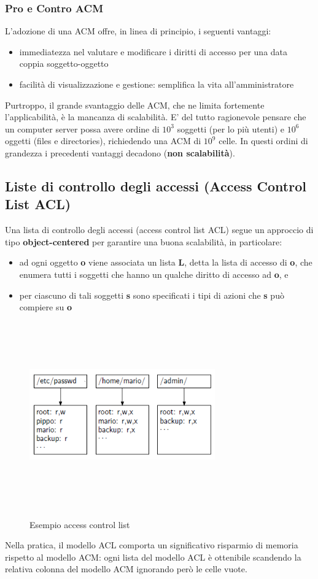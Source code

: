 \subsubsection{Pro e Contro ACM}
L'adozione di una ACM offre, in linea di principio, i seguenti vantaggi:
\begin{itemize} 
  \item immediatezza nel valutare e modificare i diritti di accesso per una data coppia soggetto-oggetto
  \item facilità di visualizzazione e gestione: semplifica la vita all'amministratore
\end{itemize}
Purtroppo, il grande svantaggio delle ACM, che ne limita fortemente l'applicabilità, è la mancanza di scalabilità. E' del tutto ragionevole pensare che un computer server possa avere ordine di $10^3$ soggetti (per lo più utenti) e $10^6$ oggetti (files e directories), richiedendo una ACM di $10^9$ celle. In questi ordini di grandezza i precedenti vantaggi decadono (\textbf{non scalabilità}).

\subsection{Liste di controllo degli accessi (Access Control List ACL)}
Una lista di controllo degli accessi (access control list ACL) segue un approccio di tipo \textbf{object-centered} per garantire una buona scalabilità, in particolare:
\begin{itemize} 
  \item ad ogni oggetto \textbf{o} viene associata un lista \textbf{L}, detta la lista di accesso di \textbf{o}, che enumera tutti i soggetti che hanno un qualche diritto di accesso ad \textbf{o}, e
  \item per ciascuno di tali soggetti \textbf{s} sono specificati i tipi di azioni che \textbf{s} può compiere su \textbf{o}
\end{itemize}
\begin{figure}[htbp]
	\centering%
	\subfigure%
	{\includegraphics[height=8cm, width=8cm, keepaspectratio]{Immagini/introduzione/access_control_list_ex.png}}
	\caption{Esempio access control list \label{fig:acl}} 	
\end{figure}
Nella pratica, il modello ACL comporta un significativo risparmio di memoria rispetto al modello ACM: ogni lista del modello ACL è ottenibile scandendo la relativa colonna del modello ACM ignorando però le celle vuote.

